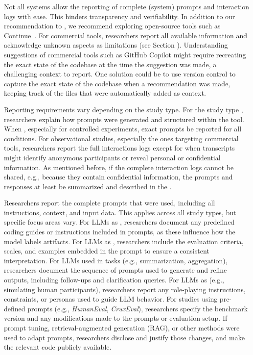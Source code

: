 Not all systems allow the reporting of complete (system) prompts and interaction logs with ease.
This hinders transparency and verifiability.
In addition to our recommendation to \openllm, we recommend exploring open-source tools such as Continue~\cite{continue.dev}.
For commercial tools, researchers \must report all available information and acknowledge unknown aspects as limitations (see Section \limitationsmitigations).
Understanding suggestions of commercial tools such as GitHub Copilot might require recreating the exact state of the codebase at the time the suggestion was made, a challenging context to report.
One solution could be to use version control to capture the exact state of the codebase when a recommendation was made, keeping track of the files that were automatically added as context.


Reporting requirements vary depending on the study type.
For the study type \newtools, researchers \must explain how prompts were generated and structured within the tool.
When \llmusage, especially for controlled experiments, exact prompts \must be reported for all conditions.
For observational studies, especially the ones targeting commercial tools, researchers \must report the full interactions logs except for when transcripts might identify anonymous participants or reveal personal or confidential information.
As mentioned before, if the complete interaction logs cannot be shared, e.g., because they contain confidential information, the prompts and responses \must at least be summarized and described in the \paper.

Researchers \must report the complete prompts that were used, including all instructions, context, and input data. This applies across all study types, but specific focus areas vary.
For LLMs as \annotators, researchers \must document any predefined coding guides or instructions included in prompts, as these influence how the model labels artifacts.
For LLMs as \judges, researchers \must include the evaluation criteria, scales, and examples embedded in the prompt to ensure a consistent interpretation.
For LLMs used in \synthesis tasks (e.g., summarization, aggregation), researchers \must document the sequence of prompts used to generate and refine outputs, including follow-ups and clarification queries.
For LLMs as \subjects (e.g., simulating human participants), researchers \must report any role-playing instructions, constraints, or personas used to guide LLM behavior.
For \benchmarkingtasks studies using pre-defined prompts (e.g., \emph{HumanEval}, \emph{CruxEval}), researchers \must specify the benchmark version and any modifications made to the prompts or evaluation setup.
If prompt tuning, retrieval-augmented generation (RAG), or other methods were used to adapt prompts, researchers \must disclose and justify those changes, and \should make the relevant code publicly available.
